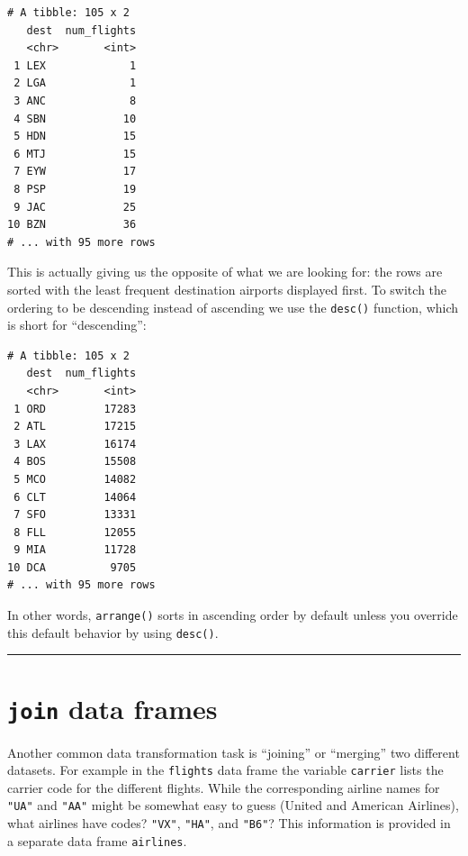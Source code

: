 \documentclass[12pt, krantz2,]{krantz}
\makeatletter
\newenvironment{Shaded}{\begin{snugshade}}{\end{snugshade}}
\newcommand{\KeywordTok}[1]{\textcolor[rgb]{0.27,0.27,0.27}{\textbf{#1}}}
\newcommand{\NormalTok}[1]{#1}
\newcommand{\OperatorTok}[1]{\textcolor[rgb]{0.43,0.43,0.43}{\textbf{#1}}}
\newcommand{\StringTok}[1]{\textcolor[rgb]{0.5,0.5,0.5}{#1}}
\newenvironment{kframe}{%
\medskip{}
\setlength{\fboxsep}{.8em}
 \def\at@end@of@kframe{}%
 \ifinner\ifhmode%
  \def\at@end@of@kframe{\end{minipage}}%
  \begin{minipage}{\columnwidth}%
 \fi\fi%
 \def\FrameCommand##1{\hskip\@totalleftmargin \hskip-\fboxsep
 \colorbox{shadecolor}{##1}\hskip-\fboxsep
     \hskip-\linewidth \hskip-\@totalleftmargin \hskip\columnwidth}%
 \MakeFramed {\advance\hsize-\width
   \@totalleftmargin\z@ \linewidth\hsize
   \@setminipage}}%
 {\par\unskip\endMakeFramed%
 \at@end@of@kframe}
\renewenvironment{Shaded}{\begin{kframe}}{\end{kframe}}
\makeatother
\begin{document}
\begin{verbatim}
# A tibble: 105 x 2
   dest  num_flights
   <chr>       <int>
 1 LEX             1
 2 LGA             1
 3 ANC             8
 4 SBN            10
 5 HDN            15
 6 MTJ            15
 7 EYW            17
 8 PSP            19
 9 JAC            25
10 BZN            36
# ... with 95 more rows
\end{verbatim}

This is actually giving us the opposite of what we are looking for: the rows are sorted with the least frequent destination airports displayed first. To switch the ordering to be descending instead of ascending we use the \texttt{desc()} function, which is short for ``descending'':

\begin{Shaded}
\end{Shaded}

\begin{verbatim}
# A tibble: 105 x 2
   dest  num_flights
   <chr>       <int>
 1 ORD         17283
 2 ATL         17215
 3 LAX         16174
 4 BOS         15508
 5 MCO         14082
 6 CLT         14064
 7 SFO         13331
 8 FLL         12055
 9 MIA         11728
10 DCA          9705
# ... with 95 more rows
\end{verbatim}

In other words, \texttt{arrange()} sorts in ascending order by default unless you override this default behavior by using \texttt{desc()}.

\begin{center}\rule{0.5\linewidth}{\linethickness}\end{center}

\hypertarget{joins}{%
\section{\texorpdfstring{\texttt{join} data frames}{join data frames}}\label{joins}}

Another common data transformation task is ``joining'' or ``merging'' two different datasets. For example in the \texttt{flights} data frame the variable \texttt{carrier} lists the carrier code for the different flights. While the corresponding airline names for \texttt{"UA"} and \texttt{"AA"} might be somewhat easy to guess (United and American Airlines), what airlines have codes? \texttt{"VX"}, \texttt{"HA"}, and \texttt{"B6"}? This information is provided in a separate data frame \texttt{airlines}.
\end{document}
